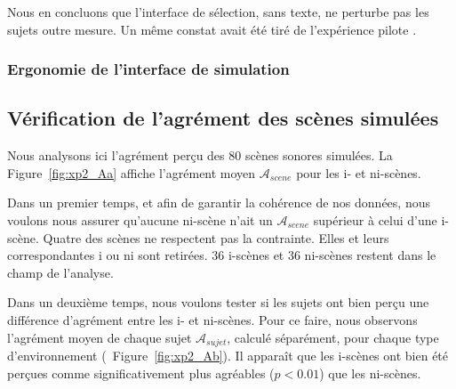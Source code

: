 Nous en concluons que l'interface de sélection, sans texte, ne perturbe pas les sujets outre mesure. Un même constat avait été tiré de l'expérience pilote \citep{lafay2013atiam,lafay2014new}. \\


\subsubsection{Ergonomie de l'interface de simulation}

\subsection{Vérification de l'agrément des scènes simulées}

Nous analysons ici l'agrément perçu des $80$ scènes sonores simulées. La Figure~\ref{fig:xp2_Aa} affiche l'agrément moyen $\mathcal{A}_{scene}$ pour les i- et ni-scènes. 

Dans un premier temps, et afin de garantir la cohérence de nos données, nous voulons nous assurer qu'aucune ni-scène n'ait un $\mathcal{A}_{scene}$ supérieur à celui d'une i-scène. Quatre des scènes ne respectent pas la contrainte. Elles et leurs correspondantes i ou ni sont retirées. 36 i-scènes et 36 ni-scènes restent dans le champ de l'analyse.

Dans un deuxième temps, nous voulons tester si les sujets ont bien perçu une différence d'agrément entre les i- et ni-scènes. Pour ce faire, nous observons l'agrément moyen de chaque sujet $\mathcal{A}_{sujet}$, calculé séparément, pour chaque type d'environnement (\cf~Figure~\ref{fig:xp2_Ab}). Il apparaît que les i-scènes ont bien été perçues comme significativement plus agréables ($p<0.01$) que les ni-scènes.

